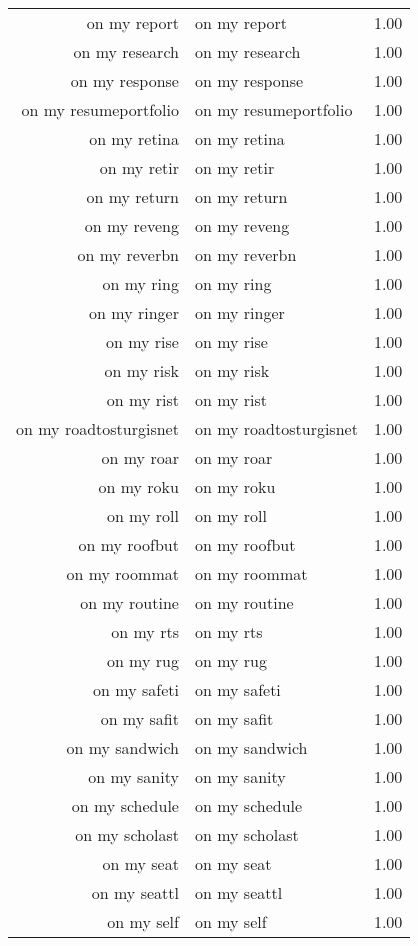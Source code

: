 \begin{table}[ht]
\begin{tabular}{rlr}
  on my report & on my report & 1.00 \\ 
  on my research & on my research & 1.00 \\ 
  on my response & on my response & 1.00 \\ 
  on my resumeportfolio & on my resumeportfolio & 1.00 \\ 
  on my retina & on my retina & 1.00 \\ 
  on my retir & on my retir & 1.00 \\ 
  on my return & on my return & 1.00 \\ 
  on my reveng & on my reveng & 1.00 \\ 
  on my reverbn & on my reverbn & 1.00 \\ 
  on my ring & on my ring & 1.00 \\ 
  on my ringer & on my ringer & 1.00 \\ 
  on my rise & on my rise & 1.00 \\ 
  on my risk & on my risk & 1.00 \\ 
  on my rist & on my rist & 1.00 \\ 
  on my roadtosturgisnet & on my roadtosturgisnet & 1.00 \\ 
  on my roar & on my roar & 1.00 \\ 
  on my roku & on my roku & 1.00 \\ 
  on my roll & on my roll & 1.00 \\ 
  on my roofbut & on my roofbut & 1.00 \\ 
  on my roommat & on my roommat & 1.00 \\ 
  on my routine & on my routine & 1.00 \\ 
  on my rts & on my rts & 1.00 \\ 
  on my rug & on my rug & 1.00 \\ 
  on my safeti & on my safeti & 1.00 \\ 
  on my safit & on my safit & 1.00 \\ 
  on my sandwich & on my sandwich & 1.00 \\ 
  on my sanity & on my sanity & 1.00 \\ 
  on my schedule & on my schedule & 1.00 \\ 
  on my scholast & on my scholast & 1.00 \\ 
  on my seat & on my seat & 1.00 \\ 
  on my seattl & on my seattl & 1.00 \\ 
  on my self & on my self & 1.00 \\ 

\end{tabular}
\end{table}
